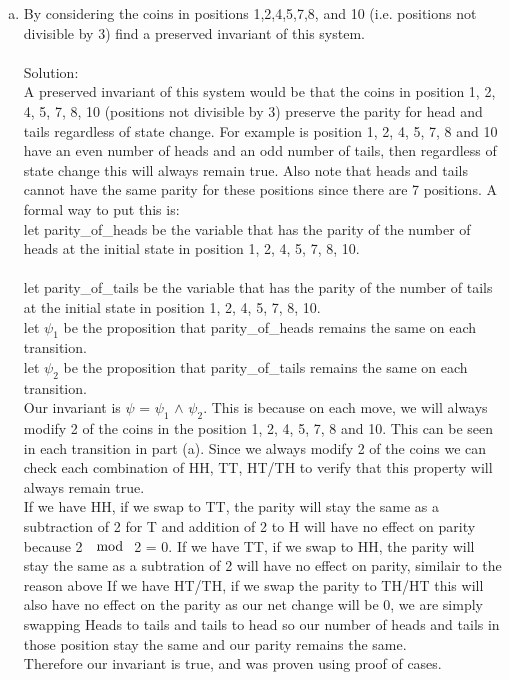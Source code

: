 \documentclass{article}
\newcommand*\moveToRight[1]{\hspace*{0em plus 1fill}\makebox{(#1)}}
\begin{document}
\begin{enumerate}[(a)]
    
    
    \item By considering the coins in positions 1,2,4,5,7,8, and 10 (i.e. positions not divisible by 3) find a preserved invariant of this system. \moveToRight{4 marks}\\\\
    Solution:\\
    A preserved invariant of this system would be that the coins in position 1, 2, 4, 5, 7, 8, 10 (positions not divisible by 3) preserve the parity for head and tails regardless of state change. For example is position 1, 2, 4, 5, 7, 8 and 10 have an even number of heads and an odd number of tails, then regardless of state change this will always remain true. Also note that heads and tails cannot have the same parity for these positions since there are 7 positions. 
    A formal way to put this is:\\
    let parity\_of\_heads be the variable that has the parity of the number of heads at the initial state in position 1, 2, 4, 5, 7, 8, 10.\\\\
    let parity\_of\_tails be the variable that has the parity of the number of tails at the initial state in position 1, 2, 4, 5, 7, 8, 10.\\
    let $\psi_1$ be the proposition that parity\_of\_heads remains the same on each transition.\\
    let $\psi_2$ be the proposition that parity\_of\_tails remains the same on each transition. \\
    Our invariant is $\psi$ = $\psi_1$ $\land$ $\psi_2$.
    This is because on each move, we will always modify 2 of the coins in the position 1, 2, 4, 5, 7, 8 and 10. This can be seen in each transition in part (a). Since we always modify 2 of the coins we can check each combination of HH, TT, HT/TH to verify that this property will always remain true.\\
    If we have HH, if we swap to TT, the parity will stay the same as a subtraction of 2 for T and addition of 2 to H will have no effect on parity because 2 $\mod$ 2 = 0. 
    If we have TT, if we swap to HH, the parity will stay the same as a subtration of 2 will have no effect on parity, similair to the reason above
    If we have HT/TH, if we swap the parity to TH/HT this will also have no effect on the parity as our net change will be 0, we are simply swapping Heads to tails and tails to head so our number of heads and tails in those position stay the same and our parity remains the same.\\
    Therefore our invariant is true, and was proven using proof of cases.
        

\end{enumerate}
\end{document}
